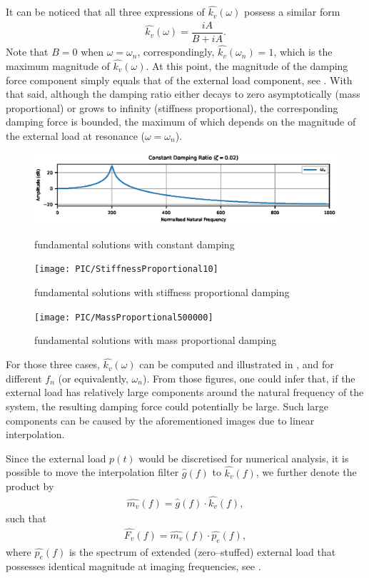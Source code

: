 It can be noticed that all three expressions of $\hat{k_v}\left(\omega\right)$ possess a similar form
\begin{gather}\label{eq:general_damping_force}
\hat{k_v}\left(\omega\right)=\dfrac{iA}{B+iA}.
\end{gather}
Note that $B=0$ when $\omega=\omega_n$, correspondingly, $\hat{k_v}\left(\omega_n\right)=1$, which is the maximum magnitude of $\hat{k_v}\left(\omega\right)$. At this point, the magnitude of the damping force component simply equals that of the external load component, see . With that said, although the damping ratio either decays to zero asymptotically (mass proportional) or grows to infinity (stiffness proportional), the corresponding damping force is bounded, the maximum of which depends on the magnitude of the external load at resonance ($\omega=\omega_n$).

\begin{figure}[htb!]
\centering
\includegraphics{PIC/ConstantProportional2000}
\caption{fundamental solutions with constant damping}\label{fig:constant_damping}
\texttt{[image: PIC/StiffnessProportional10]}
\caption{fundamental solutions with stiffness proportional damping}\label{fig:k_proportional}
\texttt{[image: PIC/MassProportional500000]}
\caption{fundamental solutions with mass proportional damping}\label{fig:m_proportional}
\end{figure}
For those three cases, $\hat{k_v}\left(\omega\right)$ can be computed and illustrated in ,  and  for different $f_n$ (or equivalently, $\omega_n$). From those figures, one could infer that, if the external load has relatively large components around the natural frequency of the system, the resulting damping force could potentially be large. Such large components can be caused by the aforementioned images due to linear interpolation.

Since the external load $p\left(t\right)$ would be discretised for numerical analysis, it is possible to move the interpolation filter $\hat{g}\left(f\right)$ to $\hat{k_v}\left(f\right)$, we further denote the product by
\begin{gather}
\hat{m_v}\left(f\right)=\hat{g}\left(f\right)\cdot\hat{k_v}\left(f\right),
\end{gather}
such that
\begin{gather}
\hat{F_v}\left(f\right)=\hat{m_v}\left(f\right)\cdot\hat{p_e}\left(f\right),
\end{gather}
where $\hat{p_e}\left(f\right)$ is the spectrum of extended (zero--stuffed) external load that possesses identical magnitude at imaging frequencies, see .

